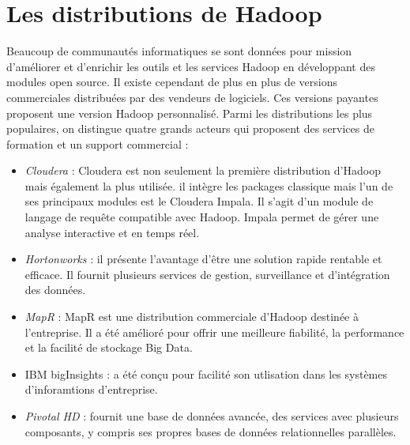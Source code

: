 \section{Les distributions de Hadoop}
Beaucoup de communautés informatiques se sont données pour mission d’améliorer et d’enrichir les outils et les services Hadoop en développant des modules open source. Il existe cependant de plus en plus de versions commerciales distribuées par des vendeurs de logiciels. Ces versions payantes proposent une version Hadoop personnalisé.  
Parmi les distributions les plus populaires, on distingue quatre grands acteurs qui proposent des services de formation et un support commercial :  
\begin{itemize}
    \item \emph{Cloudera} : Cloudera est non seulement la première distribution d’Hadoop mais également la plus utilisée. il intègre les packages classique mais l’un de ses principaux modules est le Cloudera Impala. Il s’agit d’un module de langage de requête compatible avec Hadoop. Impala permet de gérer une analyse interactive et en temps réel. 
    \item \emph{Hortonworks} : il présente l’avantage d’être une solution rapide rentable et efficace. Il fournit plusieurs services de gestion, surveillance et d’intégration des données. 
    \item \emph{MapR} : MapR est une distribution commerciale d’Hadoop destinée à l’entreprise. Il a été amélioré pour offrir une meilleure fiabilité, la performance et la facilité de stockage Big Data. 
    \item IBM bigInsights :  a été conçu pour facilité son utlisation dans les systèmes d’inforamtions  d’entreprise. 
    \item \emph{Pivotal HD} : fournit une base de données avancée, des services avec plusieurs composants, y compris ses propres bases de données relationnelles parallèles.
\end{itemize}
\cite{oussous_big_2018}







